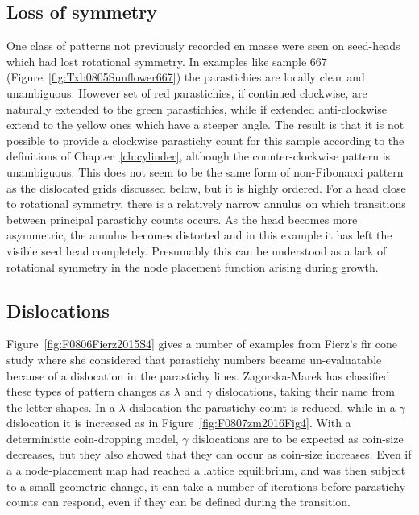 \subsection{Loss of symmetry}
One class of patterns not previously recorded en masse were seen on seed-heads which had lost rotational symmetry. In examples like sample 667 (Figure~\ref{fig:Txb0805Sunflower667}) the parastichies are locally clear and unambiguous. However set of red parastichies, if continued clockwise, are naturally extended to the green parastichies, while if extended anti-clockwise extend to the yellow ones which have a steeper angle. The result is that it is not possible to provide a clockwise parastichy count for this sample according to the definitions of Chapter~\ref{ch:cylinder}, although the counter-clockwise pattern is unambiguous. This does not seem to be the same form of non-Fibonacci pattern as the dislocated grids discussed below, but it is highly ordered.
For a head close to rotational symmetry, there is a relatively narrow annulus on which transitions between principal parastichy counts occurs. As the head becomes more asymmetric, the annulus becomes distorted and in this example it has left the visible seed head completely.  Presumably this can be understood as a lack of rotational symmetry in the node placement function arising during growth.


\subsection{Dislocations}
Figure~\ref{fig:F0806Fierz2015S4} gives a number of examples from Fierz's fir cone study where she considered that parastichy numbers became un-evaluatable because of a dislocation in the parastichy lines. 
 Zagorska-Marek has classified  these types of pattern changes as  $\lambda$ and $\gamma$ dislocations, taking their name from the letter shapes. In a $\lambda$ dislocation the parastichy count is reduced, while in a $\gamma$ dislocation it is increased as in Figure~\ref{fig:F0807zm2016Fig4}. With a deterministic coin-dropping model, $\gamma$ dislocations are to be expected as coin-size decreases, but they also showed that they can occur as coin-size increases. 
Even if a a node-placement map had reached a lattice equilibrium, and was then subject to a small geometric change, it can take a number of iterations before parastichy counts can respond, even if they can be defined during the transition. 

